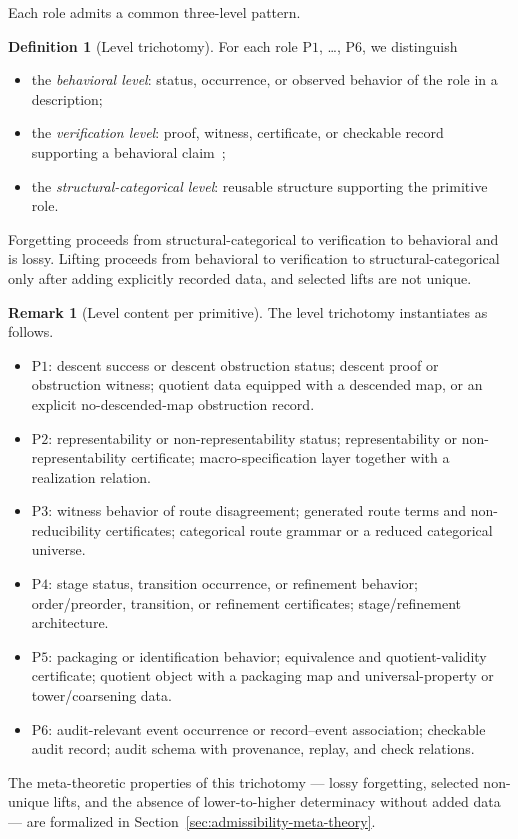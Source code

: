\documentclass[11pt]{article}
\theoremstyle{definition}
\newtheorem{definition}[theorem]{Definition}
\newtheorem{remark}[theorem]{Remark}
\newcommand{\Pone}{\ensuremath{\mathrm{P1}}}
\newcommand{\Ptwo}{\ensuremath{\mathrm{P2}}}
\newcommand{\Pthree}{\ensuremath{\mathrm{P3}}}
\newcommand{\Pfour}{\ensuremath{\mathrm{P4}}}
\newcommand{\Pfive}{\ensuremath{\mathrm{P5}}}
\newcommand{\Psix}{\ensuremath{\mathrm{P6}}}
\begin{document}
Each role admits a common three-level pattern.

\begin{definition}[Level trichotomy]\label{def:level-trichotomy}
For each role \Pone{}, \ldots, \Psix{}, we distinguish
\begin{itemize}[topsep=2pt,itemsep=1pt]
  \item the \emph{behavioral level}: status, occurrence, or observed
    behavior of the role in a description;
  \item the \emph{verification level}: proof, witness, certificate, or
    checkable record supporting a behavioral
    claim~\citep{MartinLof1984};
  \item the \emph{structural-categorical level}: reusable structure
    supporting the primitive role.
\end{itemize}
Forgetting proceeds from structural-categorical to verification to
behavioral and is lossy. Lifting proceeds from behavioral to
verification to structural-categorical only after adding explicitly
recorded data, and selected lifts are not unique.
\end{definition}

\begin{remark}[Level content per primitive]\label{rem:per-primitive-levels}
The level trichotomy instantiates as follows.
\begin{itemize}[topsep=2pt,itemsep=1pt]
  \item \Pone{}: descent success or descent obstruction status; descent
    proof or obstruction witness; quotient data equipped with a descended
    map, or an explicit no-descended-map obstruction record.
  \item \Ptwo{}: representability or non-representability status;
    representability or non-representability certificate;
    macro-specification layer together with a realization relation.
  \item \Pthree{}: witness behavior of route disagreement; generated route
    terms and non-reducibility certificates; categorical route grammar or a
    reduced categorical universe.
  \item \Pfour{}: stage status, transition occurrence, or refinement
    behavior; order/preorder, transition, or refinement certificates;
    stage/refinement architecture.
  \item \Pfive{}: packaging or identification behavior; equivalence and
    quotient-validity certificate; quotient object with a packaging map
    and universal-property or tower/coarsening data.
  \item \Psix{}: audit-relevant event occurrence or record--event
    association; checkable audit record; audit schema with provenance,
    replay, and check relations.
\end{itemize}
The meta-theoretic properties of this trichotomy --- lossy forgetting,
selected non-unique lifts, and the absence of lower-to-higher determinacy
without added data --- are formalized in
Section~\ref{sec:admissibility-meta-theory}.
\end{remark}
\end{document}
